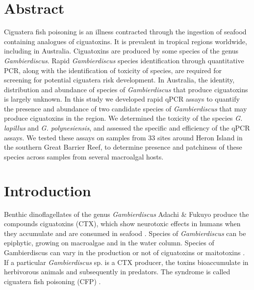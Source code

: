 \documentclass[12pt]{article}
\begin{document}
\section*{Abstract}
Ciguatera fish poisoning is an illness contracted through the ingestion of seafood containing analogues of ciguatoxins. It is prevalent in tropical regions worldwide, including in Australia. Ciguatoxins are produced by some species of the genus \emph{Gambierdiscus}. Rapid \emph{Gambierdiscus} species identification through quantitative PCR, along with the identification of toxicity of species, are required for screening for potential ciguatera risk development. In Australia, the identity, distribution and abundance of species of \textit{Gambierdiscus} that produce ciguatoxins is largely unknown. In this study we developed rapid qPCR assays to quantify the presence and abundance of two candidate species of \textit{Gambierdiscus} that may produce ciguatoxins in the region. We determined the toxicity of the species \textit{G. lapillus} and \textit{G. polynesiensis}, and assessed the specific and efficiency of the qPCR assays. We tested these assays on samples from 33 sites around Heron Island in the southern Great Barrier Reef, to determine presence and patchiness of these species across samples from several macroalgal hosts.  


\newpage
\section*{Introduction}
Benthic dinoflagellates of the genus \emph{Gambierdiscus} Adachi \& Fukuyo produce the compounds ciguatoxins (CTX), which show neurotoxic effects in humans when they accumulate and are consumed in seafood \cite{adachi1979thecal}. Species of \emph{Gambierdiscus} can be epiphytic, growing on macroalgae and in the water column. Species of Gambierdiscus can vary in the production or not of ciguatoxins or maitotoxins \cite{chinain2010ciguatera,kohli2014high}. If a particular \emph{Gambierdiscus} sp. is a CTX producer, the toxins bioaccumulate in herbivorous animals and subsequently in predators. The syndrome is called  ciguatera fish poisoning (CFP) \citep{chinain1997intraspecific,holmes1998gambierdiscus}. %
\end{document}
